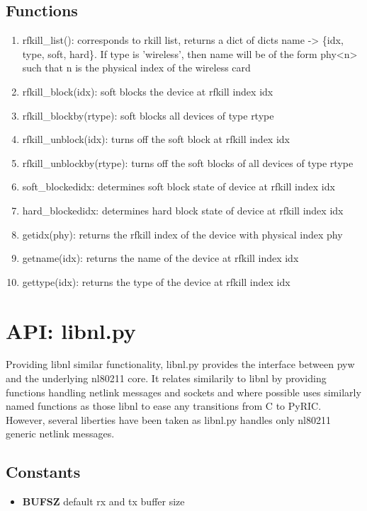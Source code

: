 \documentclass[11pt]{article}
\begin{document}
\begin{appendices}
\subsection{Functions}
\begin{enumerate}
\item rfkill\_list(): corresponds to rkill list, returns a dict of dicts name -> 
\{idx, type, soft, hard\}. If type is 'wireless', then name will be of the form
phy<n> such that n is the physical index of the wireless card 
\item rfkill\_block(idx): soft blocks the device at rfkill index idx
\item rfkill\_blockby(rtype): soft blocks all devices of type rtype
\item rfkill\_unblock(idx): turns off the soft block at rfkill index idx
\item rfkill\_unblockby(rtype): turns off the soft blocks of all devices of type
rtype
\item soft\_blocked{idx}: determines soft block state of device at rfkill index idx
\item hard\_blocked{idx}: determines hard block state of device at rfkill index idx
\item getidx(phy): returns the rfkill index of the device with physical index phy
\item getname(idx): returns the name of the device at rfkill index idx
\item gettype(idx): returns the type of the device at rfkill index idx
\end{enumerate}

\section{API: libnl.py}\label{sec:libnlapi}
Providing libnl similar functionality, libnl.py provides the interface between
pyw and the underlying nl80211 core. It relates similarily to libnl by providing
functions handling netlink messages and sockets and where possible uses similarly
named functions as those libnl to ease any transitions from C to PyRIC. However,
several liberties have been taken as libnl.py handles only nl80211 generic netlink
messages.

\subsection{Constants}
\begin{itemize}
\item \textbf{BUFSZ} default rx and tx buffer size
\end{itemize}


\end{appendices}
\end{document}
